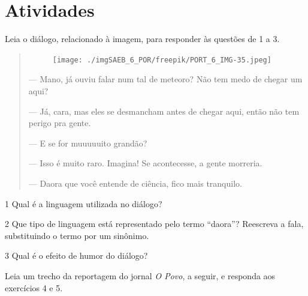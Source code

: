 \section*{Atividades}

Leia o diálogo, relacionado à imagem, para responder às questões de 1 a 3.

\begin{quote}
\begin{figure}[H]
\centering\texttt{[image: ./imgSAEB\_6\_POR/freepik/PORT\_6\_IMG-35.jpeg]}
\end{figure}

\hspace\parindent--- Mano, já ouviu falar num tal de meteoro? Não tem medo de chegar um
aqui?

--- Já, cara, mas eles se desmancham antes de chegar aqui, então
não tem perigo pra gente.

--- E se for muuuuuito grandão?

--- Isso é muito raro. Imagina! Se acontecesse, a gente morreria.

--- Daora que você entende de ciência, fico mais tranquilo.
\end{quote}

\num{1} Qual é a linguagem utilizada no diálogo?


\num{2} Que tipo de linguagem está representado pelo termo ``daora''?
Reescreva a fala, substituindo o termo por um sinônimo.


\num{3} Qual é o efeito de humor do diálogo?


Leia um trecho da reportagem do jornal \emph{O Povo}, a seguir, e
responda aos exercícios 4 e 5.

